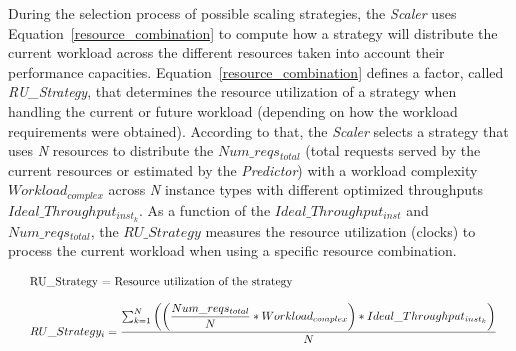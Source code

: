 During the selection process of possible scaling strategies, the \emph{Scaler} uses Equation~\ref{resource_combination} to compute how a strategy will distribute the current workload across the different resources taken into account their performance capacities.  Equation~\ref{resource_combination} defines a factor, called \emph{RU\_Strategy}, that determines the resource utilization of a strategy when handling the current or future workload (depending on how the workload requirements were obtained). According to that, the \emph{Scaler} selects a strategy that uses \emph{N} resources to distribute the \emph{$Num\_reqs_{total}$} (total requests served by the current resources or estimated by the \emph{Predictor}) with a workload complexity \emph{$Workload_{complex}$} across \emph{N} instance types with different optimized throughputs \emph{$Ideal\_Throughput_{inst_{k}}$}. As a function of the \emph{$Ideal\_Throughput_{inst}$} and \emph{$Num\_reqs_{total}$}, the \emph{$RU\_Strategy$} measures the resource utilization (clocks) to process the current workload when using a specific resource combination.





{\scriptsize
\begin{equation}\label{resource_combination}
\resizebox{\linewidth}{!}{
\begin{tabular}{l@{}l@{}}
{\small RU\_Strategy = Resource utilization of the strategy } \\ \\
$RU\_Strategy_{i} = \dfrac{ \sum_{k=1}^N \bigg( \bigg( \dfrac{ Num\_reqs_{total} } {N}  * Workload_{complex} \bigg) * Ideal\_Throughput_{inst_{k}} \bigg) }  {N}$
\end{tabular}
}
\end{equation}
}



